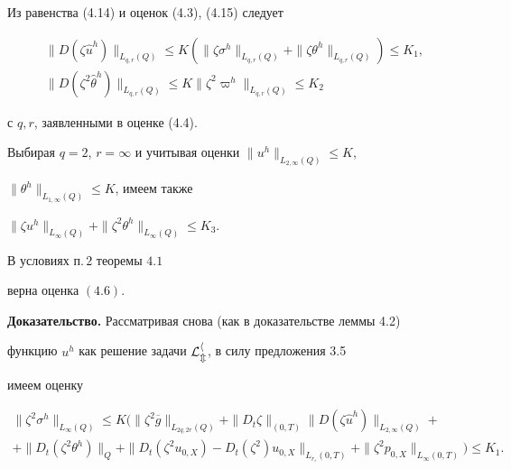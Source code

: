 \begin{pf}


Из равенства (4.14) и оценок (4.3), (4.15) следует


\begin{gather*}


\|D(\zeta\widehat u^h)\|_{L_{q,r}(Q)}\le


K(\|\zeta\sigma^h\|_{L_{q,r}(Q)}+


\|\zeta\theta^h\|_{L_{q,r}(Q)})\le K_1,\\


\|D(\zeta^2\widehat\theta^h)\|_{L_{q,r}(Q)}\le


K\|\zeta^2\varpi^h\|_{L_{q,r}(Q)}\le K_2


\end{gather*}


с $q,r$, заявленными в оценке (4.4).


Выбирая $q=2$, $r=\infty$ и учитывая оценки $\|u^h\|_{L_{2,\infty}(Q)}\le K$,


$\|\theta^h\|_{L_{1,\infty}(Q)}\le K$, имеем также\quad


$\|\zeta u^h\|_{L_\infty(Q)}+\|\zeta^2\theta^h\|_{L_\infty(Q)}\le K_3$.


\end{pf}








\begin{lems} В условиях п.\,$2$ теоремы $4.1$


верна оценка $(4.6)$.


\end{lems}





{\bf Доказательство.} Рассматривая снова (как в доказательстве леммы 4.2)


функцию $u^h$ как решение задачи $\cal L_m^h$, в силу предложения 3.5


имеем оценку


\begin{multline*}


\|\zeta^2\sigma^h\|_{L_{\infty}(Q)}\le K(


\|\zeta^2\overline g\|_{L_{2q,2r}(Q)}


+\|D_t\zeta\|_{(0,T)}\|D(\zeta\widehat u^h)\|_{L_{2,\infty}(Q)}+\\


+\|D_t(\zeta^2\theta^h)\|_Q+


\|D_t(\zeta^2u_{0,X})-D_t(\zeta^2)u_{0,X}\|_{L_{r_\varepsilon}(0,T)}+


\|\zeta^2p_{0,X}\|_{L_\infty(0,T)})\le K_1.


\end{multline*}





